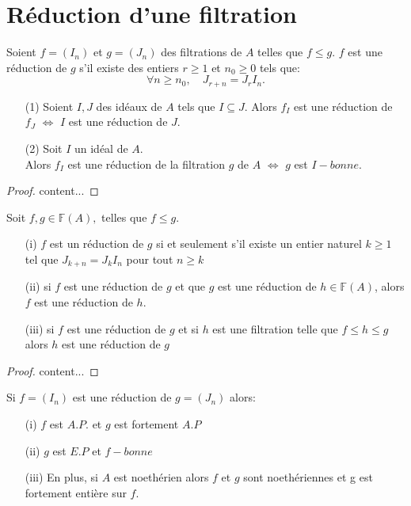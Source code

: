 \section{Réduction d'une filtration}
\begin{madefinition}
	Soient $f = (I_n)$ et $g=(J_n)$ des filtrations de $A$ telles que $f \leqslant g$.
	$f$ est une réduction de $g$ s'il existe des entiers $r \geqslant 1$ et $n_0 \geqslant 0$ tels que:
	\[ \forall n \geqslant n_0,\quad J_{r+n} = J_{r}I_{n}. \]
\end{madefinition}
\begin{maremarque}
	\begin{enumerate}
		\item[(1)] Soient $I,J$ des idéaux de $A$ tels que $I \subseteq J$. Alors $f_I$ est une réduction de $f_J$ $\Longleftrightarrow$ $I$ est une réduction de $J$.
		\item[(2)] Soit $I$ un idéal de $A$.\\ Alors $f_I$ est une réduction de la filtration $g$ de $A$ $\Longleftrightarrow$ $g$ est $I-bonne$.
	\end{enumerate}
\end{maremarque}
\begin{proof}
	content...
\end{proof}
\begin{maproposition}
	Soit $f,g \in \mathbb{F}(A),$ telles que $f \leqslant g$.
	\begin{enumerate}
		\item[(i)] $f$ est un réduction de $g$ si et seulement s'il existe un entier naturel $k \geqslant 1$ tel que $J_{k+n}  = J_{k}I_n$ pour tout $n \geqslant k$
		\item[(ii)] si $f$ est une réduction de $g$ et que $g$ est une réduction de $h \in \mathbb{F}(A)$, alors $f$ est une réduction de $h$. 
		\item[(iii)] si $f$ est une réduction de $g$ et si $h$ est une filtration telle que $f \leqslant h \leqslant g$ alors $h$ est une réduction de $g$
	\end{enumerate}
\end{maproposition}
\begin{proof}
	content...
\end{proof}
\begin{maproposition}
	Si $f=(I_n)$ est une réduction de $g=(J_n)$ alors:
	\begin{enumerate}
		\item[(i)] $f$ est $A.P.$ et $g$ est fortement $A.P$
		\item[(ii)] $g$ est $E.P$ et $f-bonne$
		\item[(iii)] En plus, si $A$ est noethérien alors $f$ et $g$ sont noethériennes et g est fortement entière sur $f$.
	\end{enumerate}
\end{maproposition}
